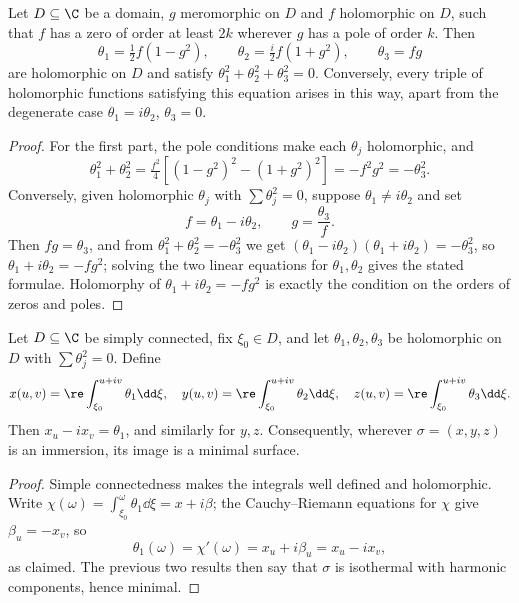 \begin{lemma}
    Let $D \subseteq \C$ be a domain, $g$ meromorphic on $D$ and $f$ holomorphic on $D$, such that $f$ has a zero of order at least $2k$ wherever $g$ has a pole of order $k$. Then
    $$
    \theta_1 = \tfrac12 f\left(1 - g^2\right), \qquad \theta_2 = \tfrac{i}{2}f\left(1+g^2\right), \qquad \theta_3 = fg
    $$
    are holomorphic on $D$ and satisfy $\theta_1^2+\theta_2^2+\theta_3^2 = 0$. Conversely, every triple of holomorphic functions satisfying this equation arises in this way, apart from the degenerate case $\theta_1 = i\theta_2$, $\theta_3 = 0$.
\end{lemma}
\begin{proof}
    For the first part, the pole conditions make each $\theta_j$ holomorphic, and
    $$
    \theta_1^2 + \theta_2^2 = \tfrac{f^2}{4}\left[(1-g^2)^2 - (1+g^2)^2\right] = -f^2g^2 = -\theta_3^2.
    $$
    Conversely, given holomorphic $\theta_j$ with $\sum\theta_j^2 = 0$, suppose $\theta_1 \neq i\theta_2$ and set
    $$
    f = \theta_1 - i\theta_2, \qquad g = \frac{\theta_3}{f}.
    $$
    Then $fg = \theta_3$, and from $\theta_1^2+\theta_2^2 = -\theta_3^2$ we get $(\theta_1-i\theta_2)(\theta_1+i\theta_2) = -\theta_3^2$, so $\theta_1 + i\theta_2 = -fg^2$; solving the two linear equations for $\theta_1,\theta_2$ gives the stated formulae. Holomorphy of $\theta_1+i\theta_2 = -fg^2$ is exactly the condition on the orders of zeros and poles.
\end{proof}

\begin{proposition}
    Let $D \subseteq \C$ be simply connected, fix $\xi_0 \in D$, and let $\theta_1,\theta_2,\theta_3$ be holomorphic on $D$ with $\sum \theta_j^2 = 0$. Define
    $$
    x(u,v) = \re\int_{\xi_0}^{u+iv}\theta_1 \dd \xi, \quad y(u,v) = \re\int_{\xi_0}^{u+iv}\theta_2\dd\xi, \quad z(u,v) = \re\int_{\xi_0}^{u+iv}\theta_3\dd\xi.
    $$
    Then $x_u - ix_v = \theta_1$, and similarly for $y,z$. Consequently, wherever $\sigma = (x,y,z)$ is an immersion, its image is a minimal surface.
\end{proposition}
\begin{proof}
    Simple connectedness makes the integrals well defined and holomorphic. Write $\chi(\omega) = \int_{\xi_0}^\omega\theta_1\dd\xi = x + i\beta$; the Cauchy--Riemann equations for $\chi$ give $\beta_u = -x_v$, so
    $$
    \theta_1(\omega) = \chi'(\omega) = x_u + i\beta_u = x_u - ix_v,
    $$
    as claimed. The previous two results then say that $\sigma$ is isothermal with harmonic components, hence minimal.
\end{proof}

